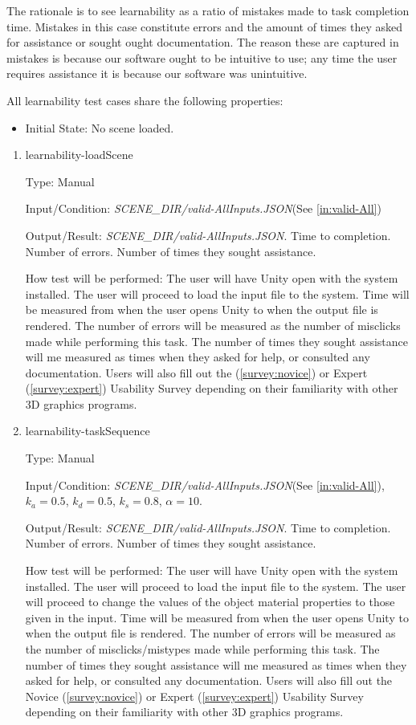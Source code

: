 \documentclass[12pt, titlepage]{article}
\begin{document}
The rationale is to see learnability as a ratio of mistakes made to task 
completion time. Mistakes in this case constitute errors and the amount of 
times they asked for assistance or sought ought documentation. The reason these 
are captured in mistakes is because our software ought to be intuitive to use; 
any time the user requires assistance it is because our software was 
unintuitive.

All learnability test cases share the following properties:
\begin{itemize}
	\item[] Initial State: No scene loaded.
\end{itemize}
\begin{enumerate}
	
	\item{learnability-loadScene\\}
	
	Type: Manual
	
	Input/Condition: \textit{SCENE\_DIR/valid-AllInputs.JSON}(See 
	\ref{in:valid-All})
	
	Output/Result: \textit{SCENE\_DIR/valid-AllInputs.JSON}. Time to 
	completion. Number of errors. Number of times they sought assistance.
	
	How test will be performed: The user will have Unity open with the system 
	installed. The user will proceed to load the input file to the system. Time 
	will be measured from when the user opens Unity to when the output file is 
	rendered. The number of errors will be measured as the number of misclicks 
	made while performing this task. The number of times they sought assistance 
	will me measured as times when they asked for help, or consulted any 
	documentation. Users will also fill out the (\ref{survey:novice}) or 
	Expert (\ref{survey:expert}) Usability 
	Survey depending on their familiarity with other 3D graphics programs.

	\item{learnability-taskSequence\\}
	
	Type: Manual
	
	Input/Condition: \textit{SCENE\_DIR/valid-AllInputs.JSON}(See 
	\ref{in:valid-All}), $k_{a} = 0.5$, 
	$k_{d} = 0.5$, $k_{s} = 0.8$, $\alpha = 10$.
	
	Output/Result: \textit{SCENE\_DIR/valid-AllInputs.JSON}. Time to 
	completion. Number of errors. Number of times they sought assistance.
	
	How test will be performed: The user will have Unity open with the system 
	installed. The user will proceed to load the input file to the system. The 
	user will proceed to change the values of the object material properties to 
	those given in the input. Time will be measured from when the user opens 
	Unity to when the output file is rendered. The number of errors will be 
	measured as the number of misclicks/mistypes made while performing this 
	task. The number of times they sought assistance 
	will me measured as times when they asked for help, or consulted any 
	documentation. Users will also fill out the Novice (\ref{survey:novice}) or 
	Expert (\ref{survey:expert}) Usability Survey depending on their 
	familiarity with other 3D graphics programs.


\end{enumerate}
\end{document}
